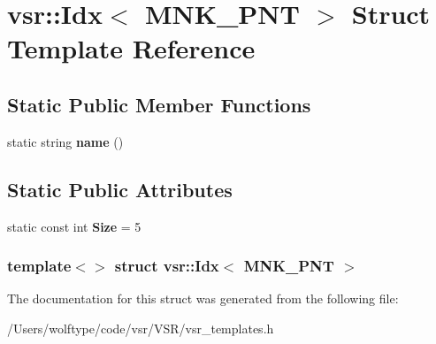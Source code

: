 \hypertarget{structvsr_1_1_idx_3_01_m_n_k___p_n_t_01_4}{\section{vsr\-:\-:Idx$<$ M\-N\-K\-\_\-\-P\-N\-T $>$ Struct Template Reference}
\label{structvsr_1_1_idx_3_01_m_n_k___p_n_t_01_4}
}
\subsection*{Static Public Member Functions}
\begin{DoxyCompactItemize}
\item 
\hypertarget{structvsr_1_1_idx_3_01_m_n_k___p_n_t_01_4_ac9188fe760095da41b49625c74492da0}{static string {\bfseries name} ()}\label{structvsr_1_1_idx_3_01_m_n_k___p_n_t_01_4_ac9188fe760095da41b49625c74492da0}

\end{DoxyCompactItemize}
\subsection*{Static Public Attributes}
\begin{DoxyCompactItemize}
\item 
\hypertarget{structvsr_1_1_idx_3_01_m_n_k___p_n_t_01_4_a3fa7949ce91cd627acf81f11125d1974}{static const int {\bfseries Size} = 5}\label{structvsr_1_1_idx_3_01_m_n_k___p_n_t_01_4_a3fa7949ce91cd627acf81f11125d1974}

\end{DoxyCompactItemize}
\subsubsection*{template$<$$>$ struct vsr\-::\-Idx$<$ M\-N\-K\-\_\-\-P\-N\-T $>$}



The documentation for this struct was generated from the following file\-:\begin{DoxyCompactItemize}
\item 
/\-Users/wolftype/code/vsr/\-V\-S\-R/vsr\-\_\-templates.\-h\end{DoxyCompactItemize}
